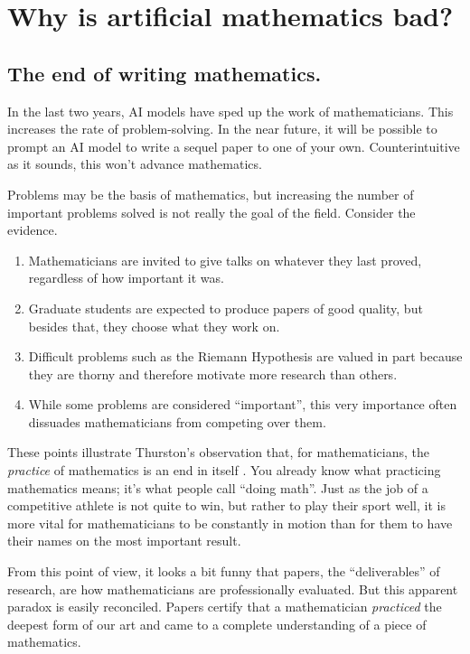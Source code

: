 \documentclass[12pt]{amsart}
\theoremstyle{definition}
\begin{document}
\section{Why is artificial mathematics bad?}

\subsection*{The end of writing mathematics.}
In the last two years, AI models have sped up the work of mathematicians. This increases the rate of problem-solving. In the near future, it will be possible to prompt an AI model to write a sequel paper to one of your own. Counterintuitive as it sounds, this won't advance mathematics.

Problems may be the basis of mathematics, but increasing the number of important problems solved is not really the goal of the field. Consider the evidence.
\begin{enumerate}
    \item Mathematicians are invited to give talks on whatever they last proved, regardless of how important it was.
    \item  Graduate students are expected to produce papers of good quality, but besides that, they choose what they work on. 
    \item Difficult problems such as the Riemann Hypothesis are valued in part because they are thorny and therefore motivate more research than others.
    \item While some problems are considered ``important'', this very importance often dissuades mathematicians from competing over them.
\end{enumerate}  

These points illustrate Thurston's observation that, for mathematicians, the \emph{practice} of mathematics is an end in itself \cite{thurston1994}. You already know what practicing mathematics means; it's what people call ``doing math''. Just as the job of a competitive athlete is not quite to win, but rather to play their sport well, it is more vital for mathematicians to be constantly in motion than for them to have their names on the most important result.

From this point of view, it looks a bit funny that papers, the ``deliverables'' of research, are how mathematicians are professionally evaluated. But this apparent paradox is easily reconciled. Papers certify that a mathematician \emph{practiced} the deepest form of our art and came to a complete understanding of a piece of mathematics.
\end{document}
